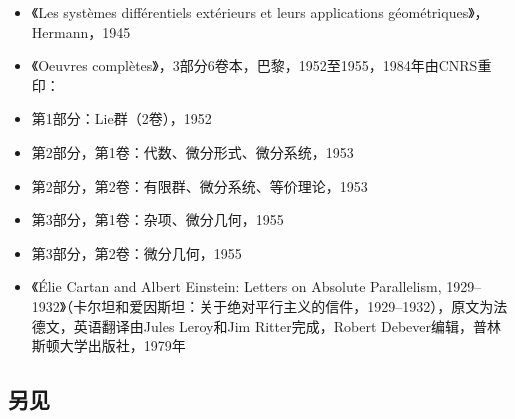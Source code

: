 \begin{itemize}
\item 《Les systèmes différentiels extérieurs et leurs applications géométriques》，Hermann，1945  
\item 《Oeuvres complètes》，3部分6卷本，巴黎，1952至1955，1984年由CNRS重印：  
\item 第1部分：Lie群（2卷），1952  
\item 第2部分，第1卷：代数、微分形式、微分系统，1953  
\item 第2部分，第2卷：有限群、微分系统、等价理论，1953  
\item 第3部分，第1卷：杂项、微分几何，1955  
\item 第3部分，第2卷：微分几何，1955  
\item 《Élie Cartan and Albert Einstein: Letters on Absolute Parallelism, 1929–1932》（卡尔坦和爱因斯坦：关于绝对平行主义的信件，1929–1932），原文为法德文，英语翻译由Jules Leroy和Jim Ritter完成，Robert Debever编辑，普林斯顿大学出版社，1979年
\end{itemize}
\subsection{另见}